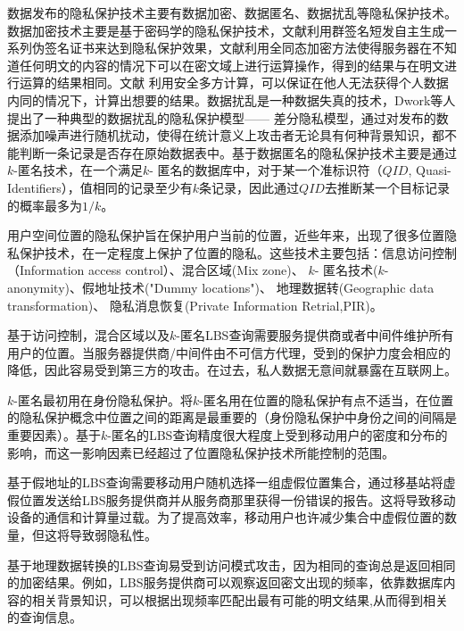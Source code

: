 数据发布的隐私保护技术主要有数据加密、数据匿名、数据扰乱等隐私保护技术。数据加密技术主要是基于密码学的隐私保护技术，文献\cite{group}利用群签名短发自主生成一系列伪签名证书来达到隐私保护效果，文献\cite{homomor}利用全同态加密方法使得服务器在不知道任何明文的内容的情况下可以在密文域上进行运算操作，得到的结果与在明文进行运算的结果相同。文献\cite{muticompute} 利用安全多方计算，可以保证在他人无法获得个人数据内同的情况下，计算出想要的结果。数据扰乱是一种数据失真的技术，Dwork等人提出了一种典型的数据扰乱的隐私保护模型—— 差分隐私模型\cite{differential}，通过对发布的数据添加噪声进行随机扰动，使得在统计意义上攻击者无论具有何种背景知识，都不能判断一条记录是否存在原始数据表中。基于数据匿名的隐私保护技术主要是通过{$k$}-匿名技术\cite{kanonomy}，在一个满足{$k$}- 匿名的数据库中，对于某一个准标识符（{$QID$}, Quasi-Identifiers），值相同的记录至少有{$k$}条记录，因此通过{$QID$}去推断某一个目标记录的概率最多为{$1/k$}。

用户空间位置的隐私保护旨在保护用户当前的位置，近些年来，出现了很多位置隐私保护技术，在一定程度上保护了位置的隐私。这些技术主要包括：信息访问控制（Information access control）\cite{Myles}\cite{Youssef}、混合区域(Mix zone)\cite{Beresford}、 {$k$}- 匿名技术({$k$}-anonymity)\cite{Bamba}\cite{Chow}\cite{Mokbel}、假地址技术("Dummy locations")\cite{YiuML}\cite{Shankar}、 地理数据转(Geographic data transformation)\cite{HuH}\cite{Khoshgozaran}、 隐私消息恢复(Private Information Retrial,PIR)\cite{Ghinita}\cite{GhinitaPRIVE}。

基于访问控制，混合区域以及{$k$}-匿名LBS查询需要服务提供商或者中间件维护所有用户的位置。当服务器提供商/中间件由不可信方代理，受到的保护力度会相应的降低，因此容易受到第三方的攻击。在过去，私人数据无意间就暴露在互联网上。

{$k$}-匿名最初用在身份隐私保护。将{$k$}-匿名用在位置的隐私保护有点不适当，在位置的隐私保护概念中位置之间的距离是最重要的（身份隐私保护中身份之间的间隔是重要因素）。基于{$k$}-匿名的LBS查询精度很大程度上受到移动用户的密度和分布的影响，而这一影响因素已经超过了位置隐私保护技术所能控制的范围。

基于假地址的LBS查询需要移动用户随机选择一组虚假位置集合，通过移基站将虚假位置发送给LBS服务提供商并从服务商那里获得一份错误的报告。这将导致移动设备的通信和计算量过载。为了提高效率，移动用户也许减少集合中虚假位置的数量，但这将导致弱隐私性。

基于地理数据转换的LBS查询易受到访问模式攻击\cite{Williams}，因为相同的查询总是返回相同的加密结果。例如，LBS服务提供商可以观察返回密文出现的频率，依靠数据库内容的相关背景知识，可以根据出现频率匹配出最有可能的明文结果,从而得到相关的查询信息。

